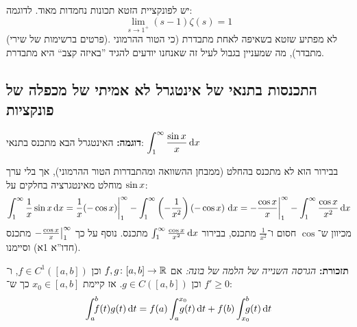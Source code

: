 \documentclass[]{../../../../tex/classes/styledArticle}
\newcommand\Is{\dequad \ }
\begin{document}
	יש לפונקציית הזטא תכונות נחמדות מאוד. לדוגמה: 
	\[ \lim_{s \to 1^{+}}(s-1)\zeta(s) = 1 \]
	(פרטים ברשימות של שירי). לא מפתיע שזטא בשאיפה לאחת מתבדרת (כי הטור ההרמוני מתבדר), מה שמעניין בגבול לעיל זה שאנחנו יודעים להגיד ''באיזה קצב`` היא מתבדרת. 
	\subsection*{התכנסות בתנאי של אינטגרל לא אמיתי של מכפלה של פונקציות}
	\textbf{דוגמה: }האינטגרל הבא מתכנס בתנאי: \hfill $\displaystyle \int^{\infty}_1 \frac{\sin x}{x}\,\mathrm{d}x$
	
	בבירור הוא לא מתכנס בהחלט (ממבחן ההשוואה ומהתבדרות הטור ההרמוני), אך בלי ערך מוחלט מאינטגרציה בחלקים על $\sin x$: 
	\[ \int^{\infty}_1\frac{1}{x}\sin x \,\mathrm{d}x = \frac{1}{x}(-\cos x)\bigg\vert^{\infty}_1 - \int^{\infty}_1\left ( -\frac{1}{x^{2}} \right )\left ( -\cos x \right )\,\mathrm{d}x = -\frac{\cos x}{x}\bigg\vert^{\infty}_1 - \int^{\infty}_1\frac{\cos x}{x^{2}}\,\mathrm{d}x \]
	מכיוון ש־$\cos$ חסום ו־$\frac{1}{x^{2}}$ מתכנס, בבירור $\int^{\infty}_1\frac{\cos x}{x^{2}}\,\mathrm{d}x$ מתכנס. נוסף על כך $-\frac{\cos x}{x}\big\vert^{\infty}_1$ מתכנס (חדו''א 1א) וסיימנו. 
	
	
	\textbf{תזכורת: }\textit{הגרסה השנייה של הלמה של בונה: }אם $f, g \colon [a, b] \to \mathbb{R}$ וכן $f \in C^{1}([a, b])$, ו־$f' \ge 0$ וכן $g \in C([a, b])$. אז קיימת $x_0 \in [a, b]$ כך ש־: 
	\[ \int^{b}_a \Is f(t)g(t)\dt = f(a)\int^{x_0}_a \dequad g(t)\dt + f(b)\int^{b}_{x_0} \Is g(t)\dt \]
	
\end{document}
